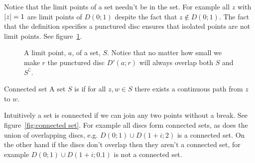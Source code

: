 \documentclass{article}
\newcommand{\discOpen}[2]{D\left({#1}; {#2}\right)}
\newcommand{\discPunctured}[2]{D'\left({#1}; {#2}\right)}
\newcommand{\union}{\cup}
\begin{document}
    Notice that the limit points of a set needn't be in the set.
    For example all \(z\) with \(\abs{z} = 1\) are limit points of \(\discOpen{0}{1}\) despite the fact that \(z\notin \discOpen{0}{1}\).
    The fact that the definition specifies a punctured disc ensures that isolated points are not limit points.
    See figure~\ref{fig:limit point}.
    \begin{figure}[ht]
        \centering
        \tikzexternalenable
        \tikzexternaldisable
        \caption{A limit point, \(a\), of a set, \(S\). Notice that no matter how small we make \(r\) the punctured disc \(\discPunctured{a}{r}\) will always overlap both \(S\) and \(S^{\complement}\).}
        \label{fig:limit point}
    \end{figure}
    
    \begin{definition}{Connected set}{}
        A set \(S\) is  if for all \(z, w\in S\) there exists a continuous path from \(z\) to \(w\).
    \end{definition}
    Intuitively a set is connected if we can join any two points without a break.
    See figure~\ref{fig:connected set}.
    For example all discs form connected sets, as does the union of overlapping discs, e.g. \(\discOpen{0}{1}\union\discOpen{1 + i}{2}\) is a connected set.
    On the other hand if the discs don't overlap then they aren't a connected set, for example \(\discOpen{0}{1}\union\discOpen{1 + i}{0.1}\) is not a connected set.
    
\end{document}
